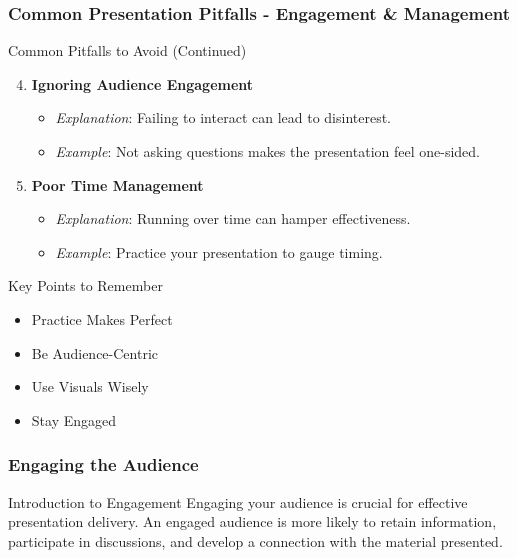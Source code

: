 \documentclass[aspectratio=169]{beamer}
\begin{document}
\begin{frame}[fragile]
    \frametitle{Common Presentation Pitfalls - Engagement & Management}
    \begin{block}{Common Pitfalls to Avoid (Continued)}
        \begin{enumerate}
            \setcounter{enumi}{3} %
            \item \textbf{Ignoring Audience Engagement}
                \begin{itemize}
                    \item \textit{Explanation}: Failing to interact can lead to disinterest.
                    \item \textit{Example}: Not asking questions makes the presentation feel one-sided.
                \end{itemize}
            \item \textbf{Poor Time Management}
                \begin{itemize}
                    \item \textit{Explanation}: Running over time can hamper effectiveness.
                    \item \textit{Example}: Practice your presentation to gauge timing.
                \end{itemize}
        \end{enumerate}
    \end{block}
    
    \begin{block}{Key Points to Remember}
        \begin{itemize}
            \item Practice Makes Perfect
            \item Be Audience-Centric
            \item Use Visuals Wisely
            \item Stay Engaged
        \end{itemize}
    \end{block}
\end{frame}

\begin{frame}[fragile]
    \frametitle{Engaging the Audience}
    
    \begin{block}{Introduction to Engagement}
        Engaging your audience is crucial for effective presentation delivery. 
        An engaged audience is more likely to retain information, participate in discussions, 
        and develop a connection with the material presented.
    \end{block}
\end{frame}
\end{document}
